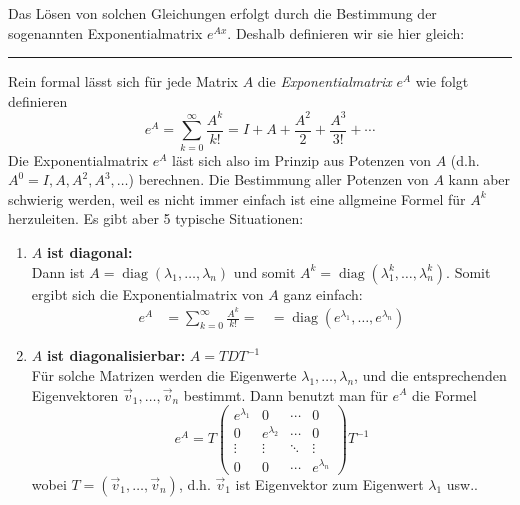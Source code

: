 \documentclass[a4paper,landscape,8pt]{extarticle}
\newcommand{\diag}{\operatorname{diag}}
\newcommand{\sep}{\vspace{5pt}\noindent\hrule\vspace{5pt}}
\begin{document}
\begin{multicols*}{4}
Das Lösen von solchen Gleichungen erfolgt durch die Bestimmung der sogenannten
Exponentialmatrix $e^{Ax}$. Deshalb definieren wir sie hier gleich:

\sep

\Def Rein formal lässt sich für jede Matrix $A$ die \emph{Exponentialmatrix}
$e^{A}$ wie folgt definieren
\[
e^{A} = \sum_{k=0}^{\infty} \frac{A^k}{k!} = I + A + \frac{A^2}{2} +
\frac{A^3}{3!} + \cdots
\]
Die Exponentialmatrix $e^{A}$ läst sich also im Prinzip aus Potenzen von $A$
(d.h. $A^0=I, A, A^2, A^3, \ldots$) berechnen. Die Bestimmung aller Potenzen von
$A$ kann aber schwierig werden, weil es nicht immer einfach ist eine allgmeine
Formel für $A^k$ herzuleiten. Es gibt aber 5 typische Situationen:
\begin{enumerate}
  \item $A$ \textbf{ist diagonal:}\\ Dann ist $A=\diag(\lambda_1, \ldots,
  \lambda_n)$ und somit $A^k=\diag(\lambda_1^k,\ldots,\lambda_n^k)$. Somit
  ergibt sich die Exponentialmatrix von $A$ ganz einfach:
  \begin{align*}
e^{A} &= \sum_{k=0}^{\infty} \frac{A^k}{k!} =
&= \diag(e^{\lambda_1}, \ldots, e^{\lambda_n})
  \end{align*}
\item $A$ \textbf{ist diagonalisierbar:} $A=TDT^{-1}$\\
Für solche Matrizen werden die Eigenwerte $\lambda_1,\ldots,\lambda_n$, und die
entsprechenden Eigenvektoren $\vec{v}_1,\ldots,\vec{v}_n$ bestimmt. Dann benutzt
man für $e^{A}$ die Formel
\[
e^{A} = T
\begin{pmatrix}
e^{\lambda_1} & 0 & \cdots & 0\\
0 & e^{\lambda_2} & \cdots & 0\\
\vdots & \vdots & \ddots & \vdots\\
0 & 0 & \cdots & e^{\lambda_n} 
\end{pmatrix}
T^{-1}
\]
wobei $T=(\vec{v}_1, \ldots, \vec{v}_n)$, d.h. $\vec{v}_1$ ist Eigenvektor zum
Eigenwert $\lambda_1$ usw..
\end{enumerate}



\end{multicols*}
\end{document}
